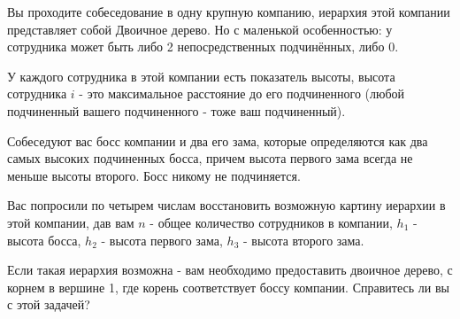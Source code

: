Вы проходите собеседование в одну крупную компанию, иерархия этой компании представляет собой Двоичное дерево. Но с маленькой особенностью: у сотрудника может быть либо 2 непосредственных подчинённых, либо 0.

У каждого сотрудника в этой компании есть показатель высоты, высота сотрудника $i$ - это максимальное расстояние до его подчиненного (любой подчиненный вашего подчиненного - тоже ваш подчиненный). 

Собеседуют вас босс компании и два его зама, которые определяются как два самых высоких подчиненных босса, причем высота первого зама всегда не меньше высоты второго. Босс никому не подчиняется.

Вас попросили по четырем числам восстановить возможную картину иерархии в этой компании, дав вам $n$ - общее количество сотрудников в компании, $h_1$ - высота босса, $h_2$ - высота первого зама, $h_3$ - высота второго зама.

Если такая иерархия возможна - вам необходимо предоставить двоичное дерево, с корнем в вершине 1, где корень соответствует боссу компании. Справитесь ли вы с этой задачей?